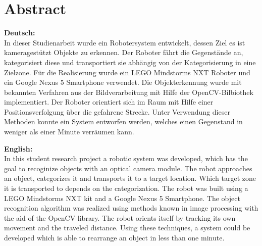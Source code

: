 \chapter*{Abstract}

\textbf{Deutsch:}\\
In dieser Studienarbeit wurde ein Robotersystem entwickelt, dessen Ziel es ist kameragestützt Objekte zu erkennen. Der Roboter fährt die Gegenstände an, kategorisiert diese und transportiert sie abhängig von der Kategorisierung in eine Zielzone. Für die Realisierung wurde ein LEGO Mindstorms NXT Roboter und ein Google Nexus 5 Smartphone verwendet. Die Objekterkennung wurde mit bekannten Verfahren aus der Bildverarbeitung mit Hilfe der OpenCV-Bilbiothek implementiert. Der Roboter orientiert sich im Raum mit Hilfe einer Positionsverfolgung über die gefahrene Strecke. Unter Verwendung dieser Methoden konnte ein System entworfen werden, welches einen Gegenstand in weniger als einer Minute verräumen kann.

\vspace{1cm}

\textbf{English:}\\
In this student research project a robotic system was developed, which has the goal to recoginize objects with an optical camera module. The robot approaches an object, categorizes it and transports it to a target location. Which target zone it is transported to depends on the categorization. The robot was built using a LEGO Mindstorms NXT kit and a Google Nexus 5 Smartphone. The object recognition algorithm was realized using methods known in image processing with the aid of the OpenCV library. The robot orients itself by tracking its own movement and the traveled distance. Using these techniques, a system could be developed which is able to rearrange an object in less than one minute.